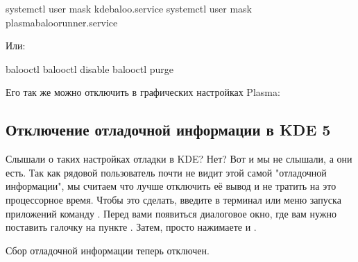 \documentclass[letterpaper,10pt,russian,openany]{sphinxmanual}
\begin{document}
\sphinxAtStartPar
{}

\begin{sphinxVerbatim}[commandchars=\\\{\}]
systemctl \PYGZhy{}\PYGZhy{}user mask kde\PYGZhy{}baloo.service           
systemctl \PYGZhy{}\PYGZhy{}user mask plasma\PYGZhy{}baloorunner.service
\end{sphinxVerbatim}

\sphinxAtStartPar
Или:

\begin{sphinxVerbatim}[commandchars=\\\{\}]
balooctl                   
balooctl disable                  
balooctl purge                    
\end{sphinxVerbatim}

\sphinxAtStartPar
Его так же можно отключить в графических настройках Plasma:

\noindent{}

\ignorespaces 

\subsection{Отключение отладочной информации в KDE 5}
\label{\detokenize{source/de-optimizations:kde-5}}\label{\detokenize{source/de-optimizations:disabling-kde-debug}}\label{\detokenize{source/de-optimizations:index-11}}
\sphinxAtStartPar
Слышали о таких настройках отладки в KDE? Нет? Вот и мы не слышали, а они есть.
Так как рядовой пользователь почти не видит этой самой "отладочной информации",
мы считаем что лучше отключить её вывод и не тратить на это процессорное время.
Чтобы это сделать, введите в терминал или меню запуска приложений команду .
Перед вами появиться диалоговое окно, где вам нужно поставить галочку на пункте .
Затем, просто нажимаете  и .

\sphinxAtStartPar
Сбор отладочной информации теперь отключен.

\noindent{}
\end{document}
